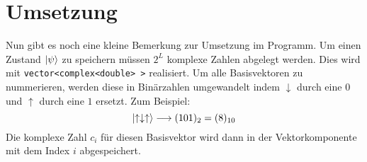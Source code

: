\documentclass[11pt,a4paper]{scrartcl}
\begin{document}
\section{Umsetzung}
Nun gibt es noch eine kleine Bemerkung zur Umsetzung im Programm. Um einen Zustand $\ket{\psi}$ zu speichern müssen $2^L$ komplexe Zahlen abgelegt werden. Dies wird mit \texttt{vector<complex<double> >} realisiert. Um alle Basisvektoren zu nummerieren, werden diese in Binärzahlen umgewandelt indem $\downarrow$ durch eine $0$ und $\uparrow$ durch eine $1$ ersetzt. Zum Beispiel:
\begin{equation*}
	\ket{\uparrow\downarrow\uparrow}\longrightarrow(101)_2=(8)_{10}
\end{equation*}
Die komplexe Zahl $c_i$ für diesen Basisvektor wird dann in der Vektorkomponente mit dem Index $i$ abgespeichert.
\end{document}
